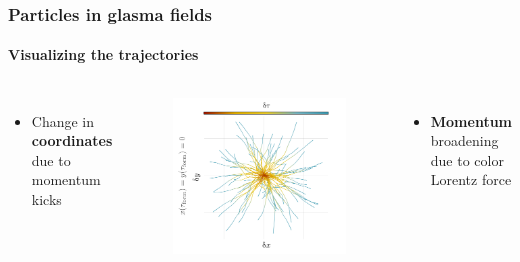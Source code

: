 \documentclass[aspectratio=169,11pt,usenames,dvipsnames]{beamer}
\begin{document}
\begin{frame}
    \frametitle{Particles in glasma fields}
    \framesubtitle{Visualizing the trajectories}
    \vspace{-0.5cm}
    \begin{columns}[onlytextwidth,t]
            \begin{itemize}\itemsep0em 
                \item \begin{center}\footnotesize Change in {\bfseries coordinates} due to momentum kicks\end{center}
            \end{itemize}
                \vspace{-20pt}
                \begin{figure}[!hbt]
                    \centering
                \includegraphics[width=1.1\columnwidth]{images/wong_coord.png}
                \end{figure}
            \begin{itemize}\itemsep0em 
                \item \begin{center}\footnotesize {\bfseries Momentum} broadening due to color Lorentz force\end{center}

\end{itemize}
\end{columns}
\end{frame}
\end{document}
